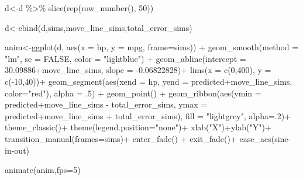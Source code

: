\documentclass[
  letterpaper,
  DIV=11,
  numbers=noendperiod]{scrreprt}
\newenvironment{Shaded}{\begin{snugshade}}{\end{snugshade}}
\newcommand{\AttributeTok}[1]{\textcolor[rgb]{0.40,0.45,0.13}{#1}}
\newcommand{\ConstantTok}[1]{\textcolor[rgb]{0.56,0.35,0.01}{#1}}
\newcommand{\DecValTok}[1]{\textcolor[rgb]{0.68,0.00,0.00}{#1}}
\newcommand{\FloatTok}[1]{\textcolor[rgb]{0.68,0.00,0.00}{#1}}
\newcommand{\FunctionTok}[1]{\textcolor[rgb]{0.28,0.35,0.67}{#1}}
\newcommand{\NormalTok}[1]{\textcolor[rgb]{0.00,0.23,0.31}{#1}}
\newcommand{\OtherTok}[1]{\textcolor[rgb]{0.00,0.23,0.31}{#1}}
\newcommand{\SpecialCharTok}[1]{\textcolor[rgb]{0.37,0.37,0.37}{#1}}
\newcommand{\StringTok}[1]{\textcolor[rgb]{0.13,0.47,0.30}{#1}}
\begin{document}
\begin{Shaded}
\begin{Highlighting}[]
\NormalTok{d}\OtherTok{\textless{}{-}}\NormalTok{d }\SpecialCharTok{\%\textgreater{}\%} \FunctionTok{slice}\NormalTok{(}\FunctionTok{rep}\NormalTok{(}\FunctionTok{row\_number}\NormalTok{(), }\DecValTok{50}\NormalTok{))}

\NormalTok{d}\OtherTok{\textless{}{-}}\FunctionTok{cbind}\NormalTok{(d,sims,move\_line\_sims,total\_error\_sims)}


\NormalTok{anim}\OtherTok{\textless{}{-}}\FunctionTok{ggplot}\NormalTok{(d, }\FunctionTok{aes}\NormalTok{(}\AttributeTok{x =}\NormalTok{ hp, }\AttributeTok{y =}\NormalTok{ mpg, }\AttributeTok{frame=}\NormalTok{sims)) }\SpecialCharTok{+}
  \FunctionTok{geom\_smooth}\NormalTok{(}\AttributeTok{method =} \StringTok{"lm"}\NormalTok{, }\AttributeTok{se =} \ConstantTok{FALSE}\NormalTok{, }\AttributeTok{color =} \StringTok{"lightblue"}\NormalTok{) }\SpecialCharTok{+}  
  \FunctionTok{geom\_abline}\NormalTok{(}\AttributeTok{intercept =} \FloatTok{30.09886}\SpecialCharTok{+}\NormalTok{move\_line\_sims, }\AttributeTok{slope =} \SpecialCharTok{{-}}\FloatTok{0.06822828}\NormalTok{)}\SpecialCharTok{+}
  \FunctionTok{lims}\NormalTok{(}\AttributeTok{x =} \FunctionTok{c}\NormalTok{(}\DecValTok{0}\NormalTok{,}\DecValTok{400}\NormalTok{), }\AttributeTok{y =} \FunctionTok{c}\NormalTok{(}\SpecialCharTok{{-}}\DecValTok{10}\NormalTok{,}\DecValTok{40}\NormalTok{))}\SpecialCharTok{+}
  \FunctionTok{geom\_segment}\NormalTok{(}\FunctionTok{aes}\NormalTok{(}\AttributeTok{xend =}\NormalTok{ hp, }\AttributeTok{yend =}\NormalTok{ predicted}\SpecialCharTok{+}\NormalTok{move\_line\_sims, }\AttributeTok{color=}\StringTok{"red"}\NormalTok{), }\AttributeTok{alpha =}\NormalTok{ .}\DecValTok{5}\NormalTok{) }\SpecialCharTok{+} 
  \FunctionTok{geom\_point}\NormalTok{() }\SpecialCharTok{+}
  \FunctionTok{geom\_ribbon}\NormalTok{(}\FunctionTok{aes}\NormalTok{(}\AttributeTok{ymin =}\NormalTok{ predicted}\SpecialCharTok{+}\NormalTok{move\_line\_sims }\SpecialCharTok{{-}}\NormalTok{ total\_error\_sims, }\AttributeTok{ymax =}\NormalTok{ predicted}\SpecialCharTok{+}\NormalTok{move\_line\_sims }\SpecialCharTok{+}\NormalTok{ total\_error\_sims), }\AttributeTok{fill =} \StringTok{"lightgrey"}\NormalTok{, }\AttributeTok{alpha=}\NormalTok{.}\DecValTok{2}\NormalTok{)}\SpecialCharTok{+} 
  \FunctionTok{theme\_classic}\NormalTok{()}\SpecialCharTok{+}
  \FunctionTok{theme}\NormalTok{(}\AttributeTok{legend.position=}\StringTok{"none"}\NormalTok{)}\SpecialCharTok{+}
  \FunctionTok{xlab}\NormalTok{(}\StringTok{"X"}\NormalTok{)}\SpecialCharTok{+}\FunctionTok{ylab}\NormalTok{(}\StringTok{"Y"}\NormalTok{)}\SpecialCharTok{+}
  \FunctionTok{transition\_manual}\NormalTok{(}\AttributeTok{frames=}\NormalTok{sims)}\SpecialCharTok{+}
  \FunctionTok{enter\_fade}\NormalTok{() }\SpecialCharTok{+} 
  \FunctionTok{exit\_fade}\NormalTok{()}\SpecialCharTok{+}
  \FunctionTok{ease\_aes}\NormalTok{(}\StringTok{\textquotesingle{}sine{-}in{-}out\textquotesingle{}}\NormalTok{)}

\FunctionTok{animate}\NormalTok{(anim,}\AttributeTok{fps=}\DecValTok{5}\NormalTok{)}
\end{Highlighting}
\end{Shaded}
\end{document}
